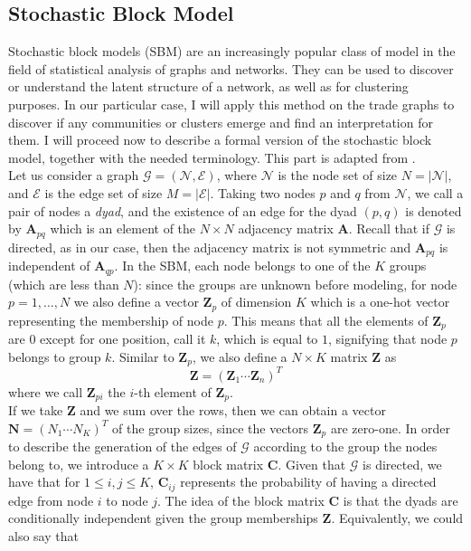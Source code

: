 \pagebreak
\subsection{Stochastic Block Model}\label{sec:sbm}
Stochastic block models (SBM) are an increasingly popular class of model in the field of statistical analysis of graphs and networks. They can be used to discover or understand the latent structure of a network, as well as for clustering purposes. In our particular case, I will apply this method on the trade graphs to discover if any communities or clusters emerge and find an interpretation for them.
I will proceed now to describe a formal version of the stochastic block model, together with the needed terminology. This part is adapted from \textcite{lee2019review}.\\
Let us consider a graph $\mathcal{G} = (\mathcal{N},\mathcal{E})$, where $\mathcal{N}$ is the node set of size $N = |\mathcal{N}|$, and $\mathcal{E}$ is the edge set of size $M = |\mathcal{E}|$. Taking two nodes $p$ and $q$ from $\mathcal{N}$, we call a pair of nodes a \textit{dyad}, and the existence of an edge for the dyad $(p,q)$ is denoted by $\mathbf{A}_{pq}$ which is an element of the $N \times N$ adjacency matrix $\mathbf{A}$. Recall that if $\mathcal{G}$ is directed, as in our case, then the adjacency matrix is not symmetric and $\mathbf{A}_{pq}$ is independent of $\mathbf{A}_{qp}$.
In the SBM, each node belongs to one of the $K$ groups (which are less than $N$): since the groups are unknown before modeling, for node $p = 1,\ldots,N$ we also define a vector $\mathbf{Z}_p$ of dimension $K$ which is a one-hot vector representing the membership of node $p$. This means that all the elements of $\mathbf{Z}_{p}$ are $0$ except for one position, call it $k$, which is equal to $1$, signifying that node $p$ belongs to group $k$.
Similar to $\mathbf{Z}_{p}$, we also define a $N \times K$ matrix $\mathbf{Z}$ as
\[
    \mathbf{Z} = (\mathbf{Z}_1 \cdots \mathbf{Z}_n)^T
\]
where we call $\mathbf{Z}_{pi}$ the $i$-th element of $\mathbf{Z}_p$.\\
If we take $\mathbf{Z}$ and we sum over the rows, then we can obtain a vector $\mathbf{N} = (N_1 \cdots N_K)^T$ of the group sizes, since the vectors $\mathbf{Z}_{p}$ are zero-one.
In order to describe the generation of the edges of $\mathcal{G}$ according to the group the nodes belong to, we introduce a $K \times K$ block matrix $\mathbf{C}$. Given that $\mathcal{G}$ is directed, we have that for $1 \leq i,j \leq K$, $\mathbf{C}_{ij}$ represents the probability of having a directed edge from node $i$ to node $j$. The idea of the block matrix $\mathbf{C}$ is that the dyads are conditionally independent given the group memberships $\mathbf{Z}$. Equivalently, we could also say that
